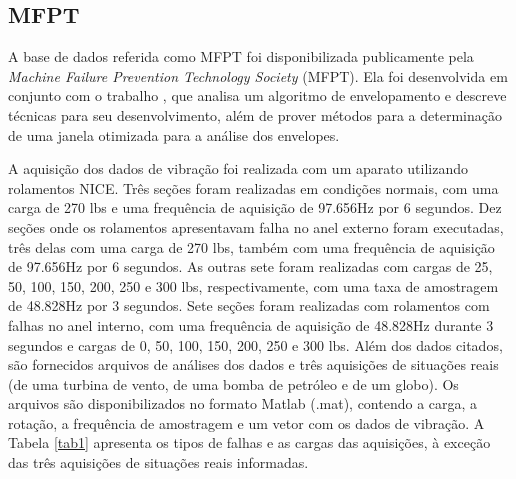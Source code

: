 \documentclass[conference]{IEEEtran}
\begin{document}
\subsection{MFPT}

A base de dados referida como MFPT foi disponibilizada publicamente pela \textit{Machine Failure Prevention Technology Society} (MFPT).
Ela foi desenvolvida em conjunto com o trabalho \cite{b13}, que analisa um algoritmo de envelopamento e descreve técnicas para seu desenvolvimento, além de prover métodos para a determinação de uma janela otimizada para a análise dos envelopes.

A aquisição dos dados de vibração foi realizada com um aparato utilizando rolamentos NICE.
Três seções foram realizadas em condições normais, com uma carga de 270 lbs e uma frequência de aquisição de 97.656Hz por 6 segundos.
Dez seções onde os rolamentos apresentavam falha no anel externo foram executadas, três delas com uma carga de 270 lbs, também com uma frequência de aquisição de 97.656Hz por 6 segundos.
As outras sete foram realizadas com cargas de 25, 50, 100, 150, 200, 250 e 300 lbs, respectivamente, com uma taxa de amostragem de 48.828Hz por 3 segundos.
Sete seções foram realizadas com rolamentos com falhas no anel interno, com uma frequência de aquisição de 48.828Hz durante 3 segundos e cargas de 0, 50, 100, 150, 200, 250 e 300 lbs.
Além dos dados citados, são fornecidos arquivos de análises dos dados e três aquisições de situações reais (de uma turbina de vento, de uma bomba de petróleo e de um globo).
Os arquivos são disponibilizados no formato Matlab (.mat), contendo a carga, a rotação, a frequência de amostragem e um vetor com os dados de vibração.
A Tabela \ref{tab1} apresenta os tipos de falhas e as cargas das aquisições, à exceção das três aquisições de situações reais informadas.
\end{document}
